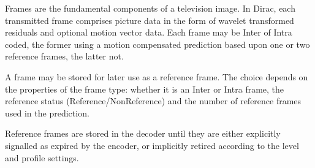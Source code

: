 Frames are the fundamental components of a television image. In Dirac,
each transmitted frame comprises picture data in the form of wavelet
transformed residuals and optional motion vector data.  Each frame may
be Inter of Intra coded, the former using a motion compensated
prediction based upon one or two reference frames, the latter not.

A frame may be stored for later use as a reference frame.  The choice
depends on the properties of the frame type: whether it is an Inter or
Intra frame,  the reference status (Reference/NonReference) and the
number of reference frames used in the prediction.

Reference frames are stored in the decoder until they are either
explicitly signalled as expired by the encoder, or implicitly retired
according to the level and profile settings.
